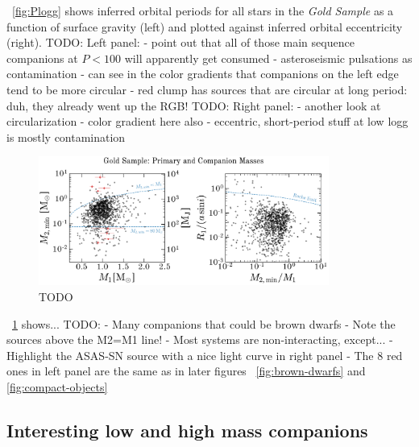\documentclass[modern]{aastex63}
\begin{document}
\figurename~\ref{fig:Plogg} shows inferred orbital periods for all stars in the
\textit{Gold Sample} as a function of surface gravity (left) and plotted against
inferred orbital eccentricity (right).
TODO: Left panel:
- point out that all of those main sequence companions at $P < 100$ will apparently get consumed
- asteroseismic pulsations as contamination
- can see in the color gradients that companions on the left edge tend to be more circular
- red clump has sources that are circular at long period: duh, they already went up the RGB!
TODO: Right panel:
- another look at circularization
- color gradient here also
- eccentric, short-period stuff at low logg is mostly contamination


\begin{figure}[t]
    \begin{center}
    \includegraphics[width=0.85\textwidth]{m2_m1_roche.pdf}
    \end{center}
    \caption{%
    TODO
    \label{fig:m2m1}
    }
\end{figure}

\figurename~\ref{fig:m2m1} shows...
TODO:
- Many companions that could be brown dwarfs
- Note the sources above the M2=M1 line!
- Most systems are non-interacting, except...
- Highlight the ASAS-SN source with a nice light curve in right panel
- The 8 red ones in left panel are the same as in later figures \figurename~\ref{fig:brown-dwarfs} and \ref{fig:compact-objects}



\subsection{Interesting low and high mass companions}
\end{document}
